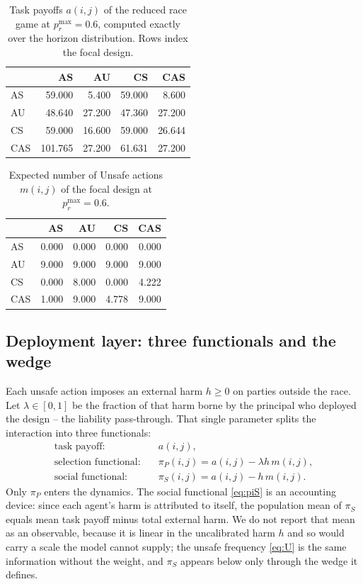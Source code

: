 \documentclass[pdflatex]{sn-jnl}
\theoremstyle{thmstyleone}
\theoremstyle{thmstylethree}
\theoremstyle{thmstyletwo}
\newcommand{\piP}{\pi_{P}}
\newcommand{\piS}{\pi_{S}}
\begin{document}
\begin{table}[htbp]
\centering
\caption{Task payoffs $a(i,j)$ of the reduced race game at $p_r^{\max}=0.6$, computed exactly over the horizon distribution. Rows index the focal design.}
\label{tab:payoff}
\begin{tabular}{lrrrr}
\toprule
 & AS & AU & CS & CAS \\
\midrule
AS & 59.000 & 5.400 & 59.000 & 8.600 \\
AU & 48.640 & 27.200 & 47.360 & 27.200 \\
CS & 59.000 & 16.600 & 59.000 & 26.644 \\
CAS & 101.765 & 27.200 & 61.631 & 27.200 \\
\bottomrule
\end{tabular}
\end{table}
\begin{table}[htbp]
\centering
\caption{Expected number of Unsafe actions $m(i,j)$ of the focal design at $p_r^{\max}=0.6$.}
\label{tab:unsafe-count}
\begin{tabular}{lrrrr}
\toprule
 & AS & AU & CS & CAS \\
\midrule
AS & 0.000 & 0.000 & 0.000 & 0.000 \\
AU & 9.000 & 9.000 & 9.000 & 9.000 \\
CS & 0.000 & 8.000 & 0.000 & 4.222 \\
CAS & 1.000 & 9.000 & 4.778 & 9.000 \\
\bottomrule
\end{tabular}
\end{table}

\subsection{Deployment layer: three functionals and the wedge}

Each unsafe action imposes an external harm $h\ge 0$ on parties outside the
race. Let $\lambda\in[0,1]$ be the fraction of that harm borne by the
principal who deployed the design -- the liability pass-through. That single
parameter splits the interaction into three functionals:
\begin{align}
\text{task payoff:}&\quad a(i,j),\\
\text{selection functional:}&\quad \piP(i,j)=a(i,j)-\lambda h\, m(i,j),
\label{eq:piP}\\
\text{social functional:}&\quad \piS(i,j)=a(i,j)-h\, m(i,j).\label{eq:piS}
\end{align}
Only $\piP$ enters the dynamics. The social functional \eqref{eq:piS} is an
accounting device: since each agent's harm is attributed to itself, the
population mean of $\piS$ equals mean task payoff minus total external harm.
We do not report that mean as an observable, because it is linear in the
uncalibrated harm $h$ and so would carry a scale the model cannot supply; the
unsafe frequency \eqref{eq:U} is the same information without the weight, and
$\piS$ appears below only through the wedge it defines.
\end{document}
